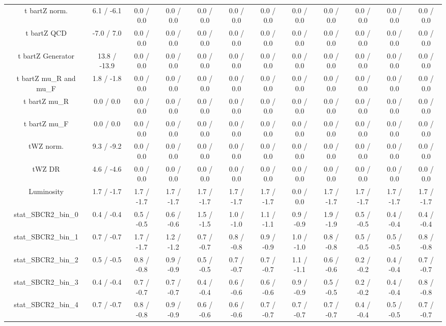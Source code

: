 \begin{table}[htbp]
\begin{center}
\begin{tabular}{|c|c|c|c|c|c|c|c|c|c|c|c|}
  t bar{t}Z norm. & 6.1 / -6.1 & 0.0 / 0.0 & 0.0 / 0.0 & 0.0 / 0.0 & 0.0 / 0.0 & 0.0 / 0.0 & 0.0 / 0.0 & 0.0 / 0.0 & 0.0 / 0.0 & 0.0 / 0.0 & 0.0 / 0.0 \\ 
  t bar{t}Z QCD & -7.0 / 7.0 & 0.0 / 0.0 & 0.0 / 0.0 & 0.0 / 0.0 & 0.0 / 0.0 & 0.0 / 0.0 & 0.0 / 0.0 & 0.0 / 0.0 & 0.0 / 0.0 & 0.0 / 0.0 & 0.0 / 0.0 \\ 
  t bar{t}Z Generator & 13.8 / -13.9 & 0.0 / 0.0 & 0.0 / 0.0 & 0.0 / 0.0 & 0.0 / 0.0 & 0.0 / 0.0 & 0.0 / 0.0 & 0.0 / 0.0 & 0.0 / 0.0 & 0.0 / 0.0 & 0.0 / 0.0 \\ 
  t bar{t}Z  mu_{R} and  mu_{F} & 1.8 / -1.8 & 0.0 / 0.0 & 0.0 / 0.0 & 0.0 / 0.0 & 0.0 / 0.0 & 0.0 / 0.0 & 0.0 / 0.0 & 0.0 / 0.0 & 0.0 / 0.0 & 0.0 / 0.0 & 0.0 / 0.0 \\ 
  t bar{t}Z  mu_{R} & 0.0 / 0.0 & 0.0 / 0.0 & 0.0 / 0.0 & 0.0 / 0.0 & 0.0 / 0.0 & 0.0 / 0.0 & 0.0 / 0.0 & 0.0 / 0.0 & 0.0 / 0.0 & 0.0 / 0.0 & 0.0 / 0.0 \\ 
  t bar{t}Z  mu_{F} & 0.0 / 0.0 & 0.0 / 0.0 & 0.0 / 0.0 & 0.0 / 0.0 & 0.0 / 0.0 & 0.0 / 0.0 & 0.0 / 0.0 & 0.0 / 0.0 & 0.0 / 0.0 & 0.0 / 0.0 & 0.0 / 0.0 \\ 
  tWZ norm. & 9.3 / -9.2 & 0.0 / 0.0 & 0.0 / 0.0 & 0.0 / 0.0 & 0.0 / 0.0 & 0.0 / 0.0 & 0.0 / 0.0 & 0.0 / 0.0 & 0.0 / 0.0 & 0.0 / 0.0 & 0.0 / 0.0 \\ 
  tWZ DR & 4.6 / -4.6 & 0.0 / 0.0 & 0.0 / 0.0 & 0.0 / 0.0 & 0.0 / 0.0 & 0.0 / 0.0 & 0.0 / 0.0 & 0.0 / 0.0 & 0.0 / 0.0 & 0.0 / 0.0 & 0.0 / 0.0 \\ 
  Luminosity & 1.7 / -1.7 & 1.7 / -1.7 & 1.7 / -1.7 & 1.7 / -1.7 & 1.7 / -1.7 & 1.7 / -1.7 & 0.0 / 0.0 & 1.7 / -1.7 & 1.7 / -1.7 & 1.7 / -1.7 & 1.7 / -1.7 \\ 
 stat_SBCR2_bin_0 & 0.4 / -0.4 & 0.5 / -0.5 & 0.6 / -0.6 & 1.5 / -1.5 & 1.0 / -1.0 & 1.1 / -1.1 & 0.9 / -0.9 & 1.9 / -1.9 & 0.5 / -0.5 & 0.4 / -0.4 & 0.4 / -0.4 \\ 
 stat_SBCR2_bin_1 & 0.7 / -0.7 & 1.7 / -1.7 & 1.2 / -1.2 & 0.7 / -0.7 & 0.8 / -0.8 & 0.9 / -0.9 & 1.0 / -1.0 & 0.8 / -0.8 & 0.5 / -0.5 & 0.5 / -0.5 & 0.8 / -0.8 \\ 
 stat_SBCR2_bin_2 & 0.5 / -0.5 & 0.8 / -0.8 & 0.9 / -0.9 & 0.5 / -0.5 & 0.7 / -0.7 & 0.7 / -0.7 & 1.1 / -1.1 & 0.6 / -0.6 & 0.2 / -0.2 & 0.4 / -0.4 & 0.7 / -0.7 \\ 
 stat_SBCR2_bin_3 & 0.4 / -0.4 & 0.7 / -0.7 & 0.7 / -0.7 & 0.4 / -0.4 & 0.6 / -0.6 & 0.6 / -0.6 & 0.9 / -0.9 & 0.5 / -0.5 & 0.2 / -0.2 & 0.4 / -0.4 & 0.8 / -0.8 \\ 
 stat_SBCR2_bin_4 & 0.7 / -0.7 & 0.8 / -0.8 & 0.9 / -0.9 & 0.6 / -0.6 & 0.6 / -0.6 & 0.7 / -0.7 & 0.7 / -0.7 & 0.7 / -0.7 & 0.4 / -0.4 & 0.5 / -0.5 & 0.7 / -0.7 \\ 

\end{tabular}
\end{center}
\end{table}
